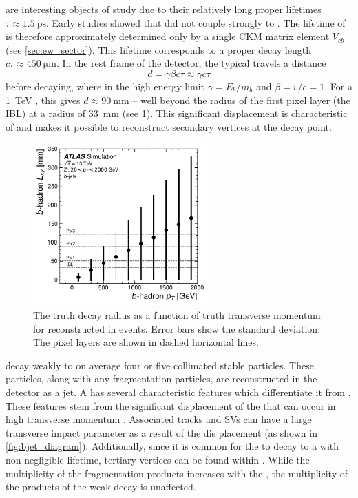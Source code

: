 \bhadrons are interesting objects of study due to their relatively long proper lifetimes $\tau \approx \SI{1.5}{\pico\second}$.
Early studies showed that \bhadrons did not couple strongly to \lquarks \cite{PhysRevLett.52.1084}.
The lifetime of \bhadrons is therefore approximately determined only by a single CKM matrix element $V_{cb}$ (see \cref{sec:ew_sector}).
This lifetime corresponds to a proper decay length $c \tau \approx \SI{450}{\micro\meter}$.
In the rest frame of the detector, the typical \bhadron travels a distance 
\begin{equation}
  d = \gamma \beta c \tau \approx \gamma c \tau
\end{equation}
before decaying, where in the high energy limit $\gamma = E_b/m_b$ and $\beta = v/c = 1$.
For a \SI{1}{\TeV} \bhadron, this gives $d \approx \SI{90}{\milli\meter}$ -- well beyond the radius of the first pixel layer (the IBL) at a radius of \SI{33}{\milli\meter} (see \cref{fig:b_lxy_vs_pt}).
This significant displacement is characteristic of \bjets and makes it possible to reconstruct secondary vertices at the \bhadron decay point.

\begin{figure}[!htbp]
  \centering
  \includegraphics[width=0.6\textwidth]{chapters/3.tracking/figs/b_pt_lxy.pdf}
  \caption{
    The truth \bhadron decay radius \Lxy as a function of truth transverse momentum \pt for reconstructed \bjets in \Zprime events.
    Error bars show the standard deviation.
    The pixel layers are shown in dashed horizontal lines.
  }
  \label{fig:b_lxy_vs_pt}
\end{figure}

\bhadrons decay weakly to on average four or five collimated stable particles.
These particles, along with any fragmentation particles, are reconstructed in the detector as a jet.
A \bjet has several characteristic features which differentiate it from \ljets.
These features stem from the significant displacement of the \bhadron that can occur in high transverse momentum \bjets.
Associated tracks and SVs can have a large transverse impact parameter \dzero as a result of the \bhadron dis placement (as shown in \cref{fig:bjet_diagram}).
Additionally, since it is common for the \bhadron to decay to a \chadron with non-negligible lifetime, tertiary vertices can be found within \bjets.
While the multiplicity of the fragmentation products increases with the \bhadron \pt, the  multiplicity of the products of the weak decay is unaffected.

